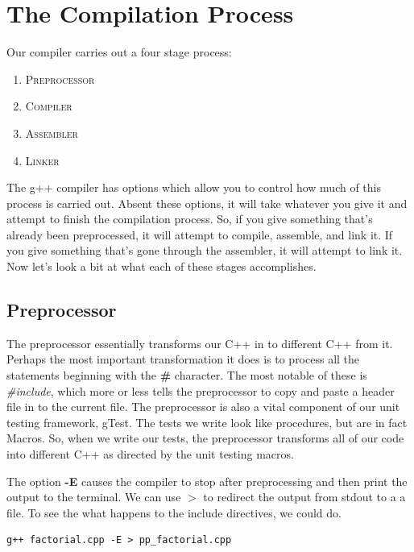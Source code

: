 \documentclass[]{tufte-handout}
\begin{document}
\section{The Compilation Process}

Our compiler carries out a four stage process: 
\begin{enumerate}
\item \textsc{Preprocessor} 
\item \textsc{Compiler} 
\item \textsc{Assembler} 
\item \textsc{Linker} 
\end{enumerate}

The g++ compiler has options which allow you to control how much of this process is carried out.  Absent these options, it will take whatever you give it and attempt to finish the compilation process. So, if you give something that's already been preprocessed, it will attempt to compile, assemble, and link it. If you give something that's gone through the assembler, it will attempt to link it. Now let's look a bit at what each of these stages accomplishes.

\subsection{Preprocessor}

The preprocessor essentially transforms our C++ in to different C++ from it. Perhaps the most important transformation it does is to process all the statements beginning with the \textbf{\#} character. The most notable of these is \textit{\#include}, which more or less tells the preprocessor to copy and paste a header file in to the current file. The preprocessor is also a vital component of our unit testing framework, gTest.  The tests we write look like procedures, but are in fact Macros. So, when we write our tests, the preprocessor transforms all of our code into different C++ as directed by the unit testing macros.

The option \textbf{-E} causes the compiler to stop after preprocessing and then print the output to the terminal.  We can use \textit{$>$} to redirect the output from stdout to a a file. To see the what happens to the include directives, we could do.
\begin{verbatim}
g++ factorial.cpp -E > pp_factorial.cpp
\end{verbatim}
\end{document}
